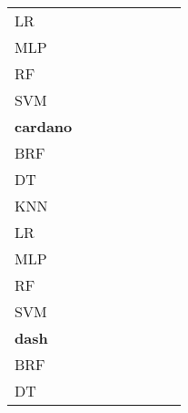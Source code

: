 \documentclass{article}
\begin{document}
{\begin{tabular}{|l|c|c|c|c|c|c|c|}
LR & \cellcolor{white}  & \cellcolor{white}  & \cellcolor{white}  & \cellcolor{gray}  & \cellcolor{white}  & \cellcolor{white}  & \cellcolor{white}  \\ 
MLP & \cellcolor{white}  & \cellcolor{white}  & \cellcolor{white}  & \cellcolor{white}  & \cellcolor{gray}  & \cellcolor{white}  & \cellcolor{white}  \\ 
RF & \cellcolor{white}  & \cellcolor{white}  & \cellcolor{white}  & \cellcolor{black}  & \cellcolor{black}  & \cellcolor{gray}  & \cellcolor{black}  \\ 
SVM & \cellcolor{white}  & \cellcolor{white}  & \cellcolor{white}  & \cellcolor{black}  & \cellcolor{black}  & \cellcolor{white}  & \cellcolor{gray}  \\ 
\hline
\textbf{cardano} \\ \hline
BRF & \cellcolor{gray}  & \cellcolor{white}  & \cellcolor{white}  & \cellcolor{white}  & \cellcolor{white}  & \cellcolor{white}  & \cellcolor{white}  \\ 
DT & \cellcolor{white}  & \cellcolor{gray}  & \cellcolor{white}  & \cellcolor{white}  & \cellcolor{white}  & \cellcolor{white}  & \cellcolor{white}  \\ 
KNN & \cellcolor{white}  & \cellcolor{white}  & \cellcolor{gray}  & \cellcolor{white}  & \cellcolor{white}  & \cellcolor{white}  & \cellcolor{white}  \\ 
LR & \cellcolor{white}  & \cellcolor{white}  & \cellcolor{white}  & \cellcolor{gray}  & \cellcolor{white}  & \cellcolor{white}  & \cellcolor{white}  \\ 
MLP & \cellcolor{white}  & \cellcolor{white}  & \cellcolor{white}  & \cellcolor{white}  & \cellcolor{gray}  & \cellcolor{white}  & \cellcolor{white}  \\ 
RF & \cellcolor{white}  & \cellcolor{white}  & \cellcolor{white}  & \cellcolor{white}  & \cellcolor{black}  & \cellcolor{gray}  & \cellcolor{white}  \\ 
SVM & \cellcolor{white}  & \cellcolor{white}  & \cellcolor{white}  & \cellcolor{white}  & \cellcolor{white}  & \cellcolor{white}  & \cellcolor{gray}  \\ 
\hline
\textbf{dash} \\ \hline
BRF & \cellcolor{gray}  & \cellcolor{white}  & \cellcolor{white}  & \cellcolor{black}  & \cellcolor{white}  & \cellcolor{white}  & \cellcolor{black}  \\ 
DT & \cellcolor{white}  & \cellcolor{gray}  & \cellcolor{white}  & \cellcolor{black}  & \cellcolor{white}  & \cellcolor{white}  & \cellcolor{black}  \\ 

\end{tabular}}
\end{document}
